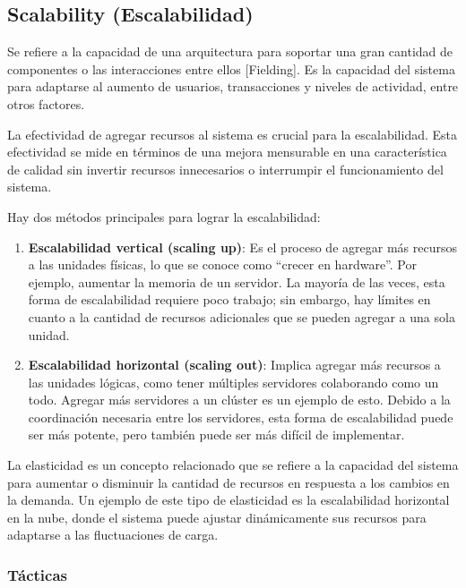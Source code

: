 \documentclass{article}
\begin{document}
 		
	
		\subsection{Scalability \small{(Escalabilidad)} }
		Se refiere a la capacidad de una arquitectura para soportar una gran cantidad de componentes o las interacciones entre ellos [Fielding]. Es la capacidad del sistema para adaptarse al aumento de usuarios, transacciones y niveles de actividad, entre otros factores.
		
		La efectividad de agregar recursos al sistema es crucial para la escalabilidad. Esta efectividad se mide en términos de una mejora mensurable en una característica de calidad sin invertir recursos innecesarios o interrumpir el funcionamiento del sistema.
		
		Hay dos métodos principales para lograr la escalabilidad:
		
		\begin{enumerate}	
			\item \textbf{Escalabilidad vertical (scaling up)}: Es el proceso de agregar más recursos a las unidades físicas, lo que se conoce como ``crecer en hardware''. Por ejemplo, aumentar la memoria de un servidor. La mayoría de las veces, esta forma de escalabilidad requiere poco trabajo; sin embargo, hay límites en cuanto a la cantidad de recursos adicionales que se pueden agregar a una sola unidad.
			
			
			\item \textbf{Escalabilidad horizontal (scaling out)}: Implica agregar más recursos a las unidades lógicas, como tener múltiples servidores colaborando como un todo. Agregar más servidores a un clúster es un ejemplo de esto. Debido a la coordinación necesaria entre los servidores, esta forma de escalabilidad puede ser más potente, pero también puede ser más difícil de implementar.
					
		\end{enumerate}
		La elasticidad es un concepto relacionado que se refiere a la capacidad del sistema para aumentar o disminuir la cantidad de recursos en respuesta a los cambios en la demanda. Un ejemplo de este tipo de elasticidad es la escalabilidad horizontal en la nube, donde el sistema puede ajustar dinámicamente sus recursos para adaptarse a las fluctuaciones de carga.
		
	\subsubsection{Tácticas}
		
\end{document}
